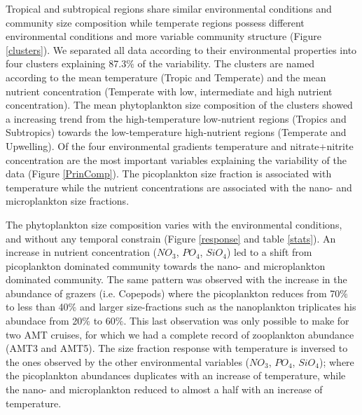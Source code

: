 Tropical and subtropical regions share similar environmental conditions and community size composition while temperate regions possess different environmental conditions and more variable community structure (Figure \ref{clusters}). We separated all data according to their environmental properties into four clusters explaining 87.3$\%$ of the variability. The clusters are named according to the mean temperature (Tropic and Temperate) and the mean nutrient concentration (Temperate with low, intermediate and high nutrient concentration). The mean phytoplankton size composition of the clusters showed a increasing trend from the high-temperature low-nutrient regions (Tropics and Subtropics) towards the low-temperature high-nutrient regions (Temperate and Upwelling). Of the four environmental gradients temperature and nitrate+nitrite concentration are the most important variables explaining the variability of the data (Figure \ref{PrinComp}). The picoplankton size fraction is associated with temperature while the nutrient concentrations are associated with the nano- and microplankton size fractions.

The phytoplankton size composition varies with the environmental conditions, and without any temporal constrain (Figure \ref{response} and table \ref{stats}). An increase in nutrient concentration ($NO_3$, $PO_4$, $SiO_4$) led to a shift from picoplankton dominated community towards the nano- and microplankton dominated community. The same pattern was observed with the increase in the abundance of grazers (i.e. Copepods) where the picoplankton reduces from 70$\%$ to less than 40$\%$ and larger size-fractions such as the nanoplankton triplicates his abundace from 20$\%$ to 60$\%$. This last observation was only possible to make for two AMT cruises, for which we had a complete record of zooplankton abundance (AMT3 and AMT5). The size fraction response with temperature is inversed to the ones observed by the other environmental variables ($NO_3$, $PO_4$, $SiO_4$); where the picoplankton abundances duplicates with an increase of temperature, while the nano- and microplankton reduced to almost a half with an increase of temperature.


